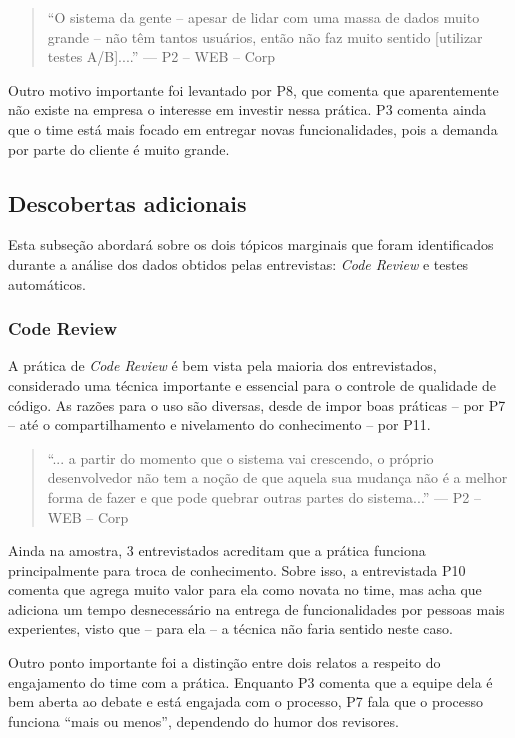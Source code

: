 \begin{quote}
    ``O sistema da gente -- apesar de lidar com uma massa de dados muito grande -- não têm tantos usuários, então não faz muito sentido [utilizar testes A/B]....'' --- P2 -- WEB -- Corp
\end{quote}

Outro motivo importante foi levantado por P8, que comenta que aparentemente não existe na empresa o interesse em investir nessa prática. P3 comenta ainda que o time está mais focado em entregar novas funcionalidades, pois a demanda por parte do cliente é muito grande.

\subsection{Descobertas adicionais}

Esta subseção abordará sobre os dois tópicos marginais que foram identificados durante a análise dos dados obtidos pelas entrevistas: \emph{Code Review} e testes automáticos.

\subsubsection{Code Review}

A prática de \emph{Code Review} \cite{codeReview} é bem vista pela maioria dos entrevistados, considerado uma técnica importante e essencial para o controle de qualidade de código. As razões para o uso são diversas, desde de impor boas práticas -- por P7 -- até o compartilhamento e nivelamento do conhecimento -- por P11.

\begin{quote}
    ``... a partir do momento que o sistema vai crescendo, o próprio desenvolvedor não tem a noção de que aquela sua mudança não é a melhor forma de fazer e que pode quebrar outras partes do sistema...'' --- P2 -- WEB -- Corp
\end{quote}

Ainda na amostra, 3 entrevistados acreditam que a prática funciona principalmente para troca de conhecimento. Sobre isso, a entrevistada P10 comenta que agrega muito valor para ela como novata no time, mas acha que adiciona um tempo desnecessário na entrega de funcionalidades por pessoas mais experientes, visto que -- para ela -- a técnica não faria sentido neste caso.

Outro ponto importante foi a distinção entre dois relatos a respeito do engajamento do time com a prática. Enquanto P3 comenta que a equipe dela é bem aberta ao debate e está engajada com o processo, P7 fala que o processo funciona ``mais ou menos'', dependendo do humor dos revisores.

